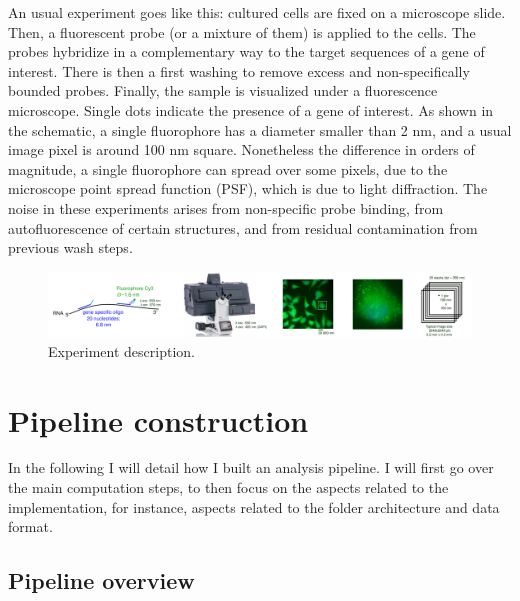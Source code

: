 \documentclass[24pt]{article}
\begin{document}
 An usual experiment goes like this: cultured cells are fixed on a microscope slide.  Then, a fluorescent probe (or a mixture of them) is applied to the cells. The probes hybridize in a complementary way to the target sequences of a gene of interest. There is then a first washing to remove excess and non-specifically bounded probes. Finally, the sample is visualized under a fluorescence microscope. Single dots 
 indicate the presence of a gene of interest. As shown in the schematic, a single fluorophore has a diameter smaller than 2 nm, and a usual image pixel is around 100 nm square. Nonetheless the difference in orders of magnitude, a single fluorophore can spread over some pixels, due to the microscope point spread function (PSF), which is due to light diffraction. The noise in these experiments arises from non-specific probe binding, from autofluorescence of certain structures, and from residual contamination from previous wash steps.
 
  
 
  \begin{figure}[h!] %
  \centering
  \includegraphics[width=1\textwidth]{Experiment_description.png} %
  \caption{Experiment description.}
  \label{fig:my_image} %
\end{figure}


  

 
 
 \newpage
\section{Pipeline construction} 
 
In the following I will detail how I built an analysis pipeline. I will first go over the main computation steps, to then focus on the aspects related to the implementation, for instance, aspects related to the folder architecture and data format. 
        
\subsection{Pipeline overview} 
\end{document}
